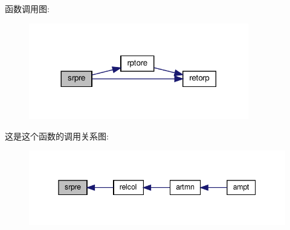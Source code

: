函数调用图\+:
\nopagebreak
\begin{figure}[H]
\begin{center}
\leavevmode
\includegraphics[width=272pt]{srpre_8f90_aa6d8bed16c3c5865e6897a067bd6c61a_cgraph}
\end{center}
\end{figure}
这是这个函数的调用关系图\+:
\nopagebreak
\begin{figure}[H]
\begin{center}
\leavevmode
\includegraphics[width=345pt]{srpre_8f90_aa6d8bed16c3c5865e6897a067bd6c61a_icgraph}
\end{center}
\end{figure}
